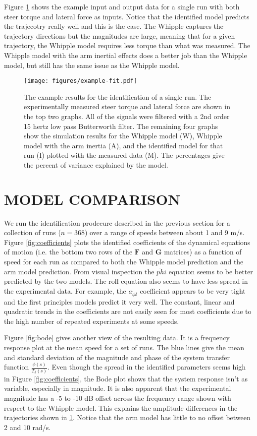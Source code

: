 \documentclass[twocolumn,10pt]{asme2e}
\begin{document}
Figure \ref{fig:exampleFit} shows the example input and output data for a
single run with both steer torque and lateral force as inputs. Notice that the
identified model predicts the trajecotry really well and this is the case. The
Whipple captures the trajectory directions but the magnitudes are large,
meaning that for a given trajectory, the Whipple model requires less torque
than what was measured. The Whipple model with the arm inertial effects does a
better job than the Whipple model, but still has the same issue as the Whipple
model.

\begin{figure}
	\texttt{[image: figures/example-fit.pdf]}
	\caption{The example results for the identification of a single run. The
	experimentally measured steer torque and lateral force are shown in the top
	two graphs. All of the signals were filtered with a 2nd order 15 hertz low
	pass Butterworth filter. The remaining four graphs show the simulation
	results for the Whipple model (W), Whipple model with the arm inertia (A),
	and the identified model for that run (I) plotted with the measured data (M).
	The percentages give the percent of variance explained by the model.}
	\label{fig:exampleFit}
\end{figure}

\section*{MODEL COMPARISON}
We run the identification prodecure described in the previous section for a
collection of runs ($n=368$) over a range of speeds between about 1 and 9 m/s.
Figure \ref{fig:coefficients} plots the identified coefficients of the
dynamical equations of motion (i.e. the bottom two rows of the \(\mathbf{F}\)
and \(\mathbf{G}\) matrices) as a function of speed for each run as compared to
both the Whipple model prediction and the arm model prediction. From visual
inspection the $\ddot{phi}$ equation seems to be better predicted by the two
models. The roll equation also seems to have less spread in the experimental data. For
example, the \(a_{\ddot{\phi}\delta}\) coefficient appears to be very tight and the
first principles models predict it very well. The constant, linear and
quadratic trends in the coefficients are not easily seen for most coefficients
due to the high number of repeated experiments at some speeds.

Figure \ref{fig:bode} gives another view of the resulting data. It is a
frequency response plot at the mean speed for a set of runs. The blue lines
give the mean and standard deviation of the magnitude and phase of the system
transfer function \(\frac{\phi(s)}{T_\delta(s)}\). Even though the spread in
the identified parameters seems high in Figure \ref{fig:coefficients}, the Bode
plot shows that the system response isn't as variable, especially in magnitude.
It is also apparent that the experimental magnitude has a -5 to -10 dB offset
across the frequency range shown with respect to the Whipple model. This
explains the amplitude differences in the trajectories shown in
\ref{fig:exampleFit}. Notice that the arm model has little to no offset between
2 and 10 rad/s.
\end{document}
